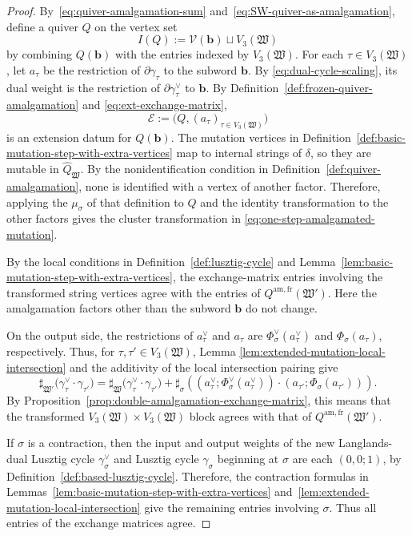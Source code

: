 \documentclass[10pt,a4paper]{article}
\theoremstyle{definition}
\theoremstyle{remark}
\newcommand{\Vcal}{\mathcal V}
\newcommand{\fW}{\mathfrak W}
\begin{document}
\begin{proof}
By~\eqref{eq:quiver-amalgamation-sum}
and~\eqref{eq:SW-quiver-as-amalgamation}, define a quiver \(Q\) on the vertex
set
\[
 I(Q):=\Vcal(\mathbf b)\sqcup V_3(\fW)
\]
by combining \(Q(\mathbf b)\) with the entries indexed by \(V_3(\fW)\).
For each \(\tau\in V_3(\fW)\), let \(a_\tau\) be the restriction of
\(\partial\gamma_\tau\) to the subword \(\mathbf b\).  By
\eqref{eq:dual-cycle-scaling}, its dual weight is the restriction of
\(\partial\gamma_\tau^\vee\) to \(\mathbf b\).  By
Definition~\ref{def:frozen-quiver-amalgamation} and
\eqref{eq:ext-exchange-matrix},
\[
 \mathcal E
 :=\bigl(Q,(a_\tau)_{\tau\in V_3(\fW)}\bigr)
\]
is an extension datum for \(Q(\mathbf b)\).  The mutation vertices in
Definition~\ref{def:basic-mutation-step-with-extra-vertices} map to internal
strings of \(\delta\), so they are mutable in \(\widehat Q_\fW\).  By the
nonidentification condition in Definition~\ref{def:quiver-amalgamation}, none
is identified with a vertex of another factor.  Therefore,
applying the \(\mu_\sigma\) of that definition to \(Q\) and the identity
transformation to the other factors gives the cluster transformation in
\eqref{eq:one-step-amalgamated-mutation}.

By the local conditions in Definition~\ref{def:lusztig-cycle} and
Lemma~\ref{lem:basic-mutation-step-with-extra-vertices}, the exchange-matrix
entries involving the transformed string vertices agree with the entries of
\(Q^{\mathrm{am,fr}}(\fW')\).  Here the amalgamation factors other than the
subword \(\mathbf b\) do not change.

On the output side, the restrictions of \(a_\tau^\vee\) and \(a_\tau\) are
\(\Phi_\sigma^\vee(a_\tau^\vee)\) and \(\Phi_\sigma(a_\tau)\), respectively.
Thus, for \(\tau,\tau'\in V_3(\fW)\), Lemma
\ref{lem:extended-mutation-local-intersection} and the additivity of the local
intersection pairing give
\[
 \sharp_{\fW'}\bigl(\gamma_\tau^\vee
   \mathbin{\cdot}\gamma_{\tau'}\bigr)
 =\sharp_\fW\bigl(\gamma_\tau^\vee
   \mathbin{\cdot}\gamma_{\tau'}\bigr)
  +\sharp_\sigma\left(
   (a_\tau^\vee;\Phi_\sigma^\vee(a_\tau^\vee))
   \mathbin{\cdot}
   (a_{\tau'};\Phi_\sigma(a_{\tau'}))
  \right).
\]
By Proposition~\ref{prop:double-amalgamation-exchange-matrix}, this means that
the transformed \(V_3(\fW)\times V_3(\fW)\) block agrees with that of
\(Q^{\mathrm{am,fr}}(\fW')\).

If \(\sigma\) is a contraction, then the input and output weights of the new
Langlands-dual Lusztig cycle \(\gamma_\sigma^\vee\) and Lusztig cycle
\(\gamma_\sigma\) beginning at \(\sigma\) are each \((0,0;1)\), by
Definition~\ref{def:based-lusztig-cycle}.  Therefore, the contraction formulas
in Lemmas~\ref{lem:basic-mutation-step-with-extra-vertices}
and~\ref{lem:extended-mutation-local-intersection} give the remaining entries
involving \(\sigma\).  Thus all entries of the exchange matrices agree.


\end{proof}
\end{document}
